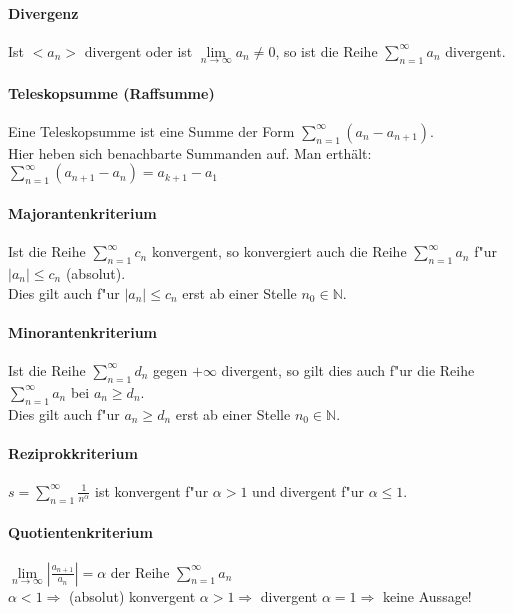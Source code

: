 \paragraph{Divergenz}
  Ist $<a_n>$ divergent oder ist $\lim\limits_{n \to \infty} a_n \neq 0$, so
  ist die Reihe $ \sum\limits_{n=1}^{\infty} a_n $ divergent.
  
\paragraph{Teleskopsumme (Raffsumme)}
Eine Teleskopsumme ist eine Summe der Form $\sum\limits_{n=1}^{\infty} (a_n - a_{n+1}).$\\ Hier heben sich benachbarte Summanden auf. 
Man erthält: $\sum\limits_{n=1}^{\infty}\left(a_{n+1}-a_{n}\right)=a_{k+1}-a_{1}$

\newpage

\paragraph{Majorantenkriterium}
  Ist die Reihe $ \sum\limits_{n=1}^{\infty} c_n $ konvergent, so konvergiert
  auch die Reihe $ \sum\limits_{n=1}^{\infty} a_n $ f"ur $|a_n| \leq c_n$ (absolut). \\ Dies gilt auch f"ur $|a_n| \leq c_n$ erst ab einer Stelle $n_0 \in \mathbb{N}$.

\paragraph{Minorantenkriterium}
  Ist die Reihe $ \sum\limits_{n=1}^{\infty} d_n $ gegen $+\infty$ divergent, so
  gilt dies auch f"ur die Reihe $ \sum\limits_{n=1}^{\infty} a_n $ bei $a_n \geq d_n$. \\ Dies gilt auch f"ur $a_n \geq d_n$ erst ab einer Stelle $n_0 \in \mathbb{N}$.

\paragraph{Reziprokkriterium}
  $ s = \sum\limits_{n=1}^{\infty} \frac{1}{n^\alpha} $ ist konvergent f"ur
  $\alpha > 1$ und divergent f"ur $\alpha \leq 1$.

\paragraph{Quotientenkriterium}
  $ \lim\limits_{n \to \infty} \left|\frac{a_{n+1}}{a_n}\right| = \alpha $ der
Reihe $ \sum\limits_{n=1}^{\infty} a_n $ \\ $\alpha < 1 \Rightarrow$ (absolut) konvergent \hspace{3cm}
  $\alpha > 1 \Rightarrow$ divergent \hspace{4cm} 
  $\alpha = 1 \Rightarrow$ keine Aussage!

